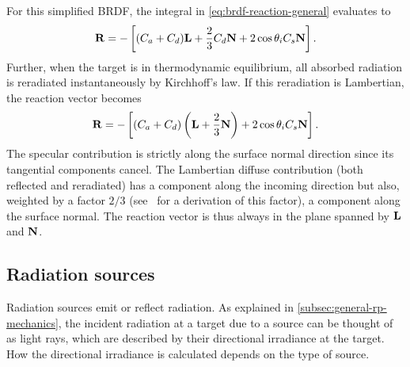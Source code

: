 For this simplified \gls{BRDF}, the integral in \cref{eq:brdf-reaction-general} evaluates to~\cite{Montenbruck2014}
\begin{align}
    \label{eq:brdf-reaction-specular-diffuse}
    \vb R = - \left[ (C_a + C_d) \vb L + \frac{2}{3} C_d \vb N + 2 \cos\theta_i C_s \vb N \right].
\end{align}
Further, when the target is in thermodynamic equilibrium, all absorbed radiation is reradiated instantaneously by Kirchhoff's law. If this reradiation is Lambertian, the reaction vector becomes~\cite{Montenbruck2014}
\begin{align}
    \label{eq:brdf-reaction-specular-diffuse-instrerad}
    \vb R = - \left[ (C_a + C_d) \left(\vb L + \frac{2}{3} \vb N\right) + 2 \cos\theta_i C_s \vb N \right].
\end{align}
The specular contribution is strictly along the surface normal direction since its tangential components cancel. The Lambertian diffuse contribution (both reflected and reradiated) has a component along the incoming direction but also, weighted by a factor $2/3$ (see~\cite{Ziebart2004} for a derivation of this factor), a component along the surface normal. The reaction vector is thus always in the plane spanned by $\vb L$ and $\vb N$.



\subsection{Radiation sources}
\label{subsec:radiation-sources}

Radiation sources emit or reflect radiation. As explained in \cref{subsec:general-rp-mechanics}, the incident radiation at a target due to a source can be thought of as light rays, which are described by their directional irradiance at the target. How the directional irradiance is calculated depends on the type of source.

